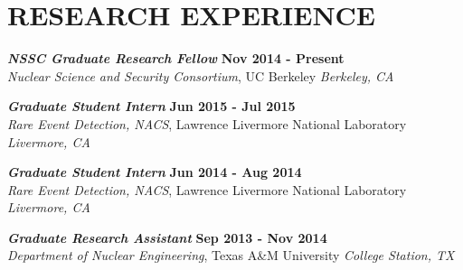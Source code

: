 \section{\small{RESEARCH EXPERIENCE}}

{\sl\bf NSSC Graduate Research Fellow} \hfill {\bf Nov 2014 - Present} \\
{\sl Nuclear Science and Security Consortium}, UC Berkeley \hfill {\sl Berkeley, CA}\\[-2.8ex]
\vspace{-5pt}

{\sl\bf Graduate Student Intern} \hfill {\bf Jun 2015 - Jul 2015} \\
{\sl Rare Event Detection, NACS}, Lawrence Livermore National Laboratory \hfill {\sl Livermore, CA}\\[-2.8ex]
\vspace{-5pt}
 
{\sl\bf Graduate Student Intern} \hfill {\bf Jun 2014 - Aug 2014} \\
{\sl Rare Event Detection, NACS}, Lawrence Livermore National Laboratory \hfill {\sl Livermore, CA}\\[-2.8ex]
\vspace{-5pt}

{\sl\bf Graduate Research Assistant} \hfill {\bf Sep 2013 - Nov 2014} \\
{\sl Department of Nuclear Engineering}, Texas A\&M University \hfill {\sl College Station, TX}\\[-2.8ex]
